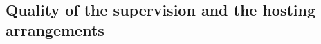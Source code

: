 \documentclass[a4paper,11pt]{article}
\begin{document}
\subsection{Quality of the supervision and the hosting arrangements}
\label{sec:supervision}

%
%
%


%
\end{document}
